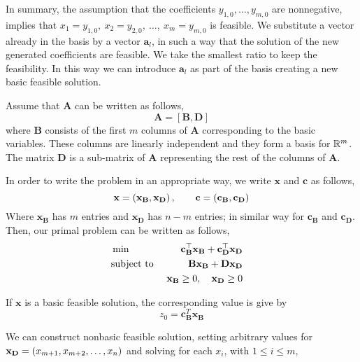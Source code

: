 In summary, the assumption that the coefficients $y_{1,0},\dots, y_{m,0}$ are nonnegative, implies that $x_1=y_{1,0},\ x_2=y_{2,0},\ \dots,\ x_m=y_{m,0}$ is feasible. We substitute a vector already in the basis by a vector $\mathbf{a}_l$, in such a way that the solution of the new generated coefficients are feasible. We take the smallest ratio to keep the feasibility. In this way we can introduce $\mathbf{a}_l$ as part of the basis creating a new basic feasible solution. 


Assume that $\mathbf{A}$ can be written as follows,
\begin{equation}
	\mathbf{A}=[\mathbf{B}, \mathbf{D}]
\end{equation}
where $\mathbf{B}$ consists of the first $m$ columns of $\mathbf{A}$ corresponding to the basic variables. These columns are linearly independent and they form a basis for $\mathbb{R}^m$. The matrix $\mathbf{D}$ is a sub-matrix  of $\mathbf{A}$ representing the rest of the columns of $\mathbf{A}$.

In order to write the problem in an appropriate way, we write $\mathbf{x}$ and $\mathbf{c}$ as follows,
\begin{equation}
	\mathbf{x}=\left( \mathbf{x}_\mathbf{B}, \mathbf{x}_{\mathbf{D}} \right), \qquad \mathbf{c}=\left( \mathbf{c}_{\mathbf{B}}, \mathbf{c}_{\mathbf D} \right)
\end{equation}
Where $\mathbf{x}_{\mathbf{B}}$ has $m$ entries and $\mathbf{x}_{\mathbf{D}}$ has $n-m$ entries; in similar way for $\mathbf{c}_{\mathbf{B}}$ and $\mathbf{c}_{\mathbf D}$. Then, our primal problem can be written as follows,
\begin{align*}
	&\min &\mathbf{c}_{\mathbf{B}}^\top\mathbf{x}_{\mathbf{B}} + \mathbf{c}_\mathbf{D}^\top \mathbf{x}_\mathbf{D}&\\
	&\text{subject to }  &\mathbf{B}\mathbf{x}_{\mathbf{B}}+\mathbf{D}\mathbf{x}_{\mathbf{D}}& &\\
	& &\mathbf{x}_{\mathbf{B}}\geq 0, \quad \mathbf{x}_{\mathbf{D}}\geq 0 & &
\end{align*}


If $\mathbf{x}$ is a basic feasible solution, the corresponding value is give by
\begin{equation*}
	z_0=\mathbf{c}_{\mathbf{B}}^T\mathbf{x}_{\mathbf{B}}
\end{equation*}

We can construct nonbasic feasible solution, setting arbitrary values for $\mathbf{x}_{\mathbf{D}}=\left( x_{m+1}, x_{m+2},\dots, x_{n} \right)$ and solving for each $x_i$, with $1\leq i\leq m$,

